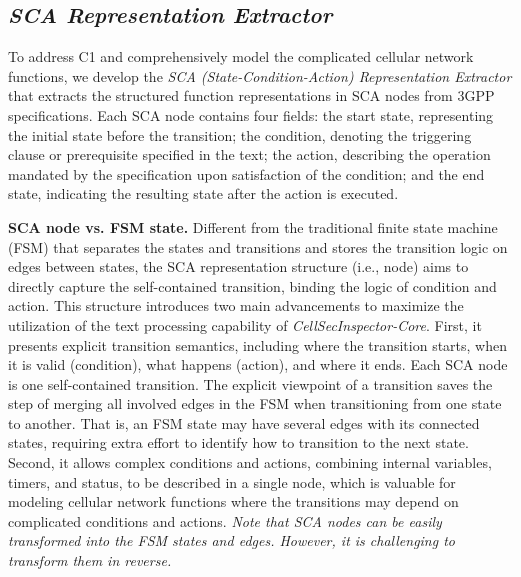 \documentclass[sigconf]{acmart}
\newcommand{\core}{\textit{CellSecInspector-Core}\xspace}
\begin{document}
{\subsection{\textit{SCA Representation Extractor}}
\label{subsect:sca_representation}

To address C1 and comprehensively model the complicated cellular network functions, we develop the \textit{SCA (State-Condition-Action) Representation Extractor} that extracts the structured function representations in SCA nodes from 3GPP specifications. Each SCA node contains four fields: the start state, representing the initial state before the transition; the condition, denoting the triggering clause or prerequisite specified in the text; the action, describing the operation mandated by the specification upon satisfaction of the condition; and the end state, indicating the resulting state after the action is executed. 

\noindent\textbf{SCA node vs. FSM state.} Different from the traditional finite state machine (FSM) that separates the states and transitions and stores the transition logic on edges between states, the SCA representation structure (i.e., node) aims to directly capture the self-contained transition, binding the logic of condition and action. This structure introduces two main advancements to maximize the utilization of the text processing capability of \core. 
First, it presents explicit transition semantics, including where the transition starts, when it is valid (condition), what happens (action), and where it ends. Each SCA node is one self-contained transition. 
The explicit viewpoint of a transition saves the step of merging all involved edges in the FSM when transitioning from one state to another.  
That is, an FSM state may have several edges with its connected states, requiring extra effort to identify how to transition to the next state. 
Second, it allows complex conditions and actions, combining internal variables, timers, and status, to be described in a single node, which is valuable for modeling cellular network functions where the transitions may depend on complicated conditions and actions. \textit{Note that SCA nodes can be easily transformed into the FSM states and edges. However, it is challenging to transform them in reverse.} 


}
\end{document}
